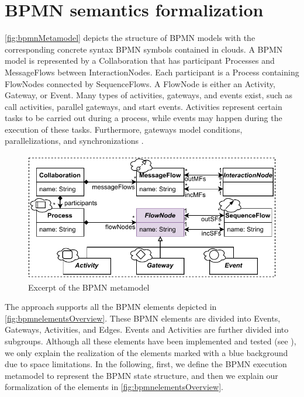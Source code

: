 \documentclass{lmcs} %
\begin{document}
\section{BPMN semantics formalization} \label{sec:formalization}

\autoref{fig:bpmnMetamodel} depicts the structure of BPMN models with the corresponding concrete syntax BPMN symbols contained in clouds.
A BPMN model is represented by a \textsf{Collaboration} that has participant \textsf{Process}es and \textsf{MessageFlow}s between \textsf{InteractionNode}s.
Each participant is a \textsf{Process} containing \textsf{FlowNode}s connected by \textsf{SequenceFlow}s.
A \textsf{FlowNode} is either an \textsf{Activity}, \textsf{Gateway}, or \textsf{Event}.
Many types of activities, gateways, and events exist, such as call activities, parallel gateways, and start events.
Activities represent certain tasks to be carried out during a process, while events may happen during the execution of these tasks.
Furthermore, gateways model conditions, parallelizations, and synchronizations \cite{freundRealLifeBPMNUsing2019}.

\begin{figure}[ht]
  \centering
  \includegraphics[width=0.8\linewidth]{images/bpmn_semantics-bpmn-metamodel.pdf}
  \caption{Excerpt of the BPMN metamodel \cite{objectmanagementgroupBusinessProcessModel2013}}
  \label{fig:bpmnMetamodel}
\end{figure}

The approach supports all the BPMN elements depicted in \autoref{fig:bpmnelementsOverview}.
These BPMN elements are divided into \textsf{Events}, \textsf{Gateways}, \textsf{Activities}, and \textsf{Edges}.
\textsf{Events} and \textsf{Activities} are further divided into subgroups.
Although all these elements have been implemented and tested (see \cite{timkrauterLMCS2024Artifacts2023}), we only explain the realization of the elements marked with a blue background due to space limitations.
In the following, first, we define the BPMN execution metamodel to represent the BPMN state structure, and then we explain our formalization of the elements in \autoref{fig:bpmnelementsOverview}.
\end{document}
